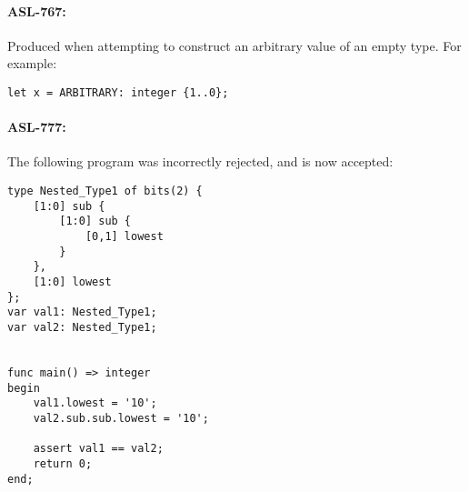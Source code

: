 \paragraph{ASL-767: }
Produced \dynamicerrorterm{} when attempting to construct an arbitrary value of an empty type.
For example:
\begin{verbatim}
let x = ARBITRARY: integer {1..0};
\end{verbatim}

\paragraph{ASL-777: }
The following program was incorrectly rejected, and is now accepted:
\begin{verbatim}
type Nested_Type1 of bits(2) {
    [1:0] sub {
        [1:0] sub {
            [0,1] lowest
        }
    },
    [1:0] lowest
};
var val1: Nested_Type1;
var val2: Nested_Type1;


func main() => integer
begin
    val1.lowest = '10';
    val2.sub.sub.lowest = '10';

    assert val1 == val2;
    return 0;
end;
\end{verbatim}
